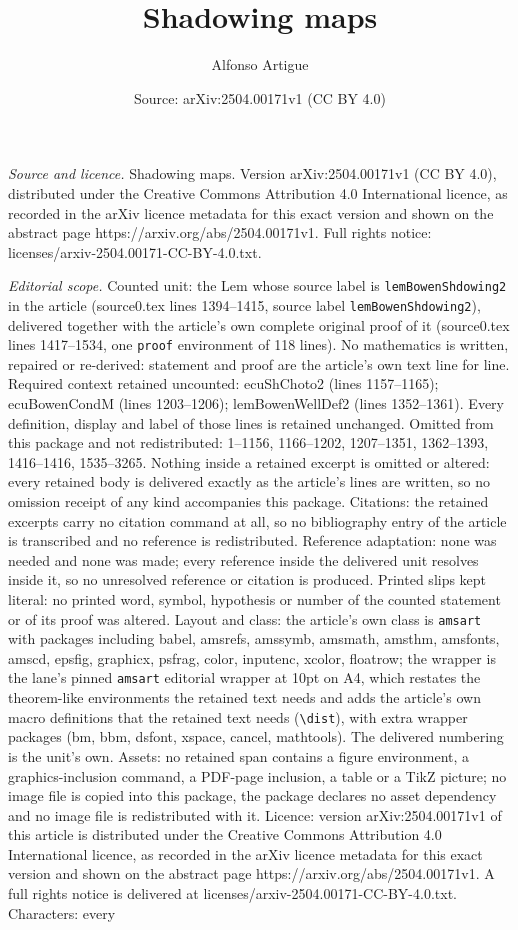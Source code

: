 \documentclass[10pt,a4paper]{amsart}
\title[Shadowing maps]{Shadowing maps}
\author{Alfonso Artigue}
\date{Source: arXiv:2504.00171v1 (CC BY 4.0)}
\begin{document}
\maketitle

\noindent\emph{Source and licence.} Shadowing maps. Version arXiv:2504.00171v1 (CC BY 4.0), distributed under the Creative Commons Attribution 4.0 International licence, as recorded in the arXiv licence metadata for this exact version and shown on the abstract page https://arxiv.org/abs/2504.00171v1. Full rights notice: licenses/arxiv-2504.00171-CC-BY-4.0.txt.\par\smallskip

\noindent\textit{Editorial scope.} Counted unit: the Lem whose source label is \texttt{lemBowenShdowing2} in the article (source0.tex lines 1394--1415, source label \texttt{lemBowenShdowing2}), delivered together with the article's own complete original proof of it (source0.tex lines 1417--1534, one \texttt{proof} environment of 118 lines). No mathematics is written, repaired or re-derived: statement and proof are the article's own text line for line. Required context retained uncounted: ecuShChoto2 (lines 1157--1165); ecuBowenCondM (lines 1203--1206); lemBowenWellDef2 (lines 1352--1361). Every definition, display and label of those lines is retained unchanged. Omitted from this package and not redistributed: 1--1156, 1166--1202, 1207--1351, 1362--1393, 1416--1416, 1535--3265. Nothing inside a retained excerpt is omitted or altered: every retained body is delivered exactly as the article's lines are written, so no omission receipt of any kind accompanies this package. Citations: the retained excerpts carry no citation command at all, so no bibliography entry of the article is transcribed and no reference is redistributed. Reference adaptation: none was needed and none was made; every reference inside the delivered unit resolves inside it, so no unresolved reference or citation is produced. Printed slips kept literal: no printed word, symbol, hypothesis or number of the counted statement or of its proof was altered. Layout and class: the article's own class is \texttt{amsart} with packages including babel, amsrefs, amssymb, amsmath, amsthm, amsfonts, amscd, epsfig, graphicx, psfrag, color, inputenc, xcolor, floatrow; the wrapper is the lane's pinned \texttt{amsart} editorial wrapper at 10pt on A4, which restates the theorem-like environments the retained text needs and adds the article's own macro definitions that the retained text needs (\texttt{\textbackslash dist}), with extra wrapper packages (bm, bbm, dsfont, xspace, cancel, mathtools). The delivered numbering is the unit's own. Assets: no retained span contains a figure environment, a graphics-inclusion command, a PDF-page inclusion, a table or a TikZ picture; no image file is copied into this package, the package declares no asset dependency and no image file is redistributed with it. Licence: version arXiv:2504.00171v1 of this article is distributed under the Creative Commons Attribution 4.0 International licence, as recorded in the arXiv licence metadata for this exact version and shown on the abstract page https://arxiv.org/abs/2504.00171v1. A full rights notice is delivered at licenses/arxiv-2504.00171-CC-BY-4.0.txt. Characters: every 
\end{document}
